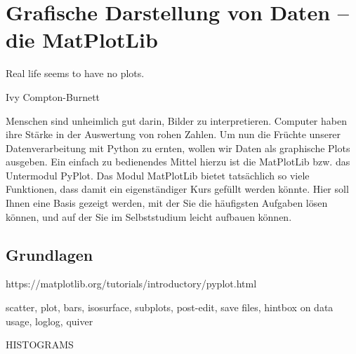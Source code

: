 \chapter{Grafische Darstellung von Daten -- die MatPlotLib}
\label{chp:Matplotlib}
\epigraph{
	Real life seems to have no plots.
}{Ivy Compton-Burnett}

Menschen sind unheimlich gut darin, Bilder zu interpretieren. Computer haben ihre Stärke in der Auswertung von rohen Zahlen. Um nun die Früchte unserer Datenverarbeitung mit Python zu ernten, wollen wir Daten als graphische Plots ausgeben. Ein einfach zu bedienendes Mittel hierzu ist die MatPlotLib bzw. das Untermodul PyPlot. Das Modul MatPlotLib bietet tatsächlich so viele Funktionen, dass damit ein eigenständiger Kurs gefüllt werden könnte. Hier soll Ihnen eine Basis gezeigt werden, mit der Sie die häufigsten Aufgaben lösen können, und auf der Sie im Selbststudium leicht aufbauen können.

\section{Grundlagen}
https://matplotlib.org/tutorials/introductory/pyplot.html




scatter, plot, bars, isosurface, subplots, post-edit, save files, hintbox on data usage, loglog, quiver

HISTOGRAMS